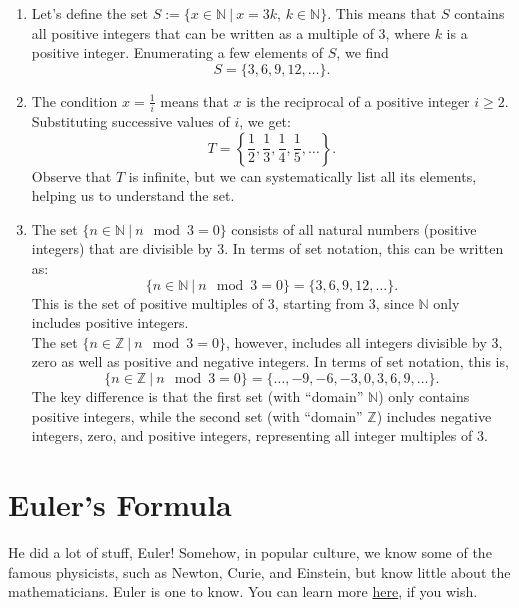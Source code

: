 \solution

\begin{enumerate}
\renewcommand{\labelenumi}{(\alph{enumi})}
\setlength{\itemsep}{.2cm}
    \item Let’s define the set \(S := \{x \in \mathbb{N} ~\big|~ x = 3k, \, k \in \mathbb{N}\}.\) This means that $S$ contains all positive integers that can be written as a multiple of 3, where $k$ is a positive integer. Enumerating a few elements of $S$, we find
        \[
        S = \{3, 6, 9, 12, \ldots\}.
        \]

    \item The condition $x = \frac{1}{i}$ means that $x$ is the reciprocal of a positive integer $i \geq 2$. Substituting successive values of $i$, we get:
        \[
        T = \left\{\frac{1}{2}, \frac{1}{3}, \frac{1}{4}, \frac{1}{5}, \ldots \right\}.
        \]
Observe that $T$ is infinite, but we can systematically list all its elements, helping us to understand the set.

\item The set $\{ n \in \mathbb{N} ~\big|~ n \mod 3 = 0 \}$ consists of all natural numbers (positive integers) that are divisible by 3. In terms of set notation, this can be written as:
\[
\{ n \in \mathbb{N} ~\big|~ n \mod 3 = 0 \} = \{3, 6, 9, 12, \ldots\}.
\]
This is the set of positive multiples of 3, starting from 3, since $\mathbb{N}$ only includes positive integers.\\

The set $\{ n \in \mathbb{Z} ~\big|~ n \mod 3 = 0 \}$, however, includes all integers divisible by 3, zero as well as positive and negative integers. In terms of set notation, this is,
\[
\{ n \in \mathbb{Z} ~\big|~ n \mod 3 = 0 \} = \{\ldots, -9, -6, -3, 0, 3, 6, 9, \ldots\}.
\]
The key difference is that the first set (with ``domain'' $\mathbb{N}$) only contains positive integers, while the second set (with ``domain'' $\mathbb{Z}$) includes negative integers, zero, and positive integers, representing all integer multiples of 3.
   
\end{enumerate}
\Qed




\section{Euler's Formula}
\label{sec:IntroEulerFormula}

He did a lot of stuff, Euler! Somehow, in popular culture, we know some of the famous physicists, such as Newton, Curie, and Einstein, but know little about the mathematicians. Euler is one to know. You can learn more \href{https://en.wikipedia.org/wiki/Leonhard_Euler}{here}, if you wish.

